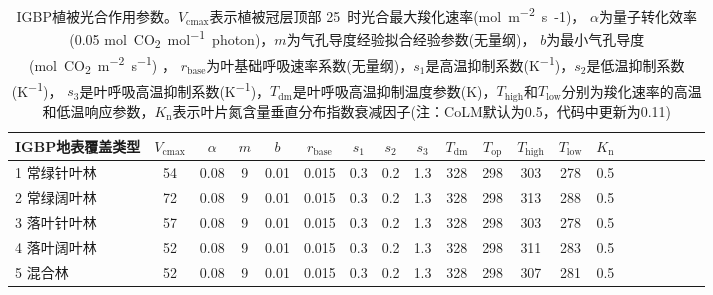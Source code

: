 \begin{landscape}
  \begin{table}[htbp]
    \centering
    \caption[IGBP植被光合作用参数]{IGBP植被光合作用参数。$V_{\mathrm{cmax}}$表示植被冠层顶部 25~\textcelsius 时光合最大羧化速率(\unit{mol.m^{-2}.s{-1}})，
      $\alpha$为量子转化效率(0.05 \unit{mol.CO_2.mol^{-1}.photon})，$m$为气孔导度经验拟合经验参数(无量纲)，
      $b$为最小气孔导度(\unit{mol.CO_2.m^{-2}.s^{-1}}) ，
      $r_{\mathrm{base}}$为叶基础呼吸速率系数(无量纲)，$s_1$是高温抑制系数(\unit{K^{-1}})，$s_2$是低温抑制系数(\unit{K^{-1}})，
    $s_3$是叶呼吸高温抑制系数(\unit{K^{-1}})，$T_{\mathrm{dm}}$是叶呼吸高温抑制温度参数(K)，$T_{\mathrm{high}}$和$T_{\mathrm{low}}$分别为羧化速率的高温和低温响应参数，$K_{\mathrm {n}} $表示叶片氮含量垂直分布指数衰减因子(注：CoLM默认为0.5，代码中更新为0.11)}
    \label{tab:IGBP植被光合作用参数1}
    \begin{tabular}{@{}lccccccccccccccccccc@{}}
      \toprule
      IGBP地表覆盖类型        & $ V_{\mathrm{cmax}}$ & $\alpha$ & $m$ & $b$  & $r_{\mathrm{base}}$ & $s_1$ & $s_2$ & $s_3$ & $T_{\mathrm{dm}}$ & $T_{\mathrm{op}}$ & $T_{\mathrm{high}}$ & $T_{\mathrm{low}}$ & $K_{\mathrm {n}} $ \\ \midrule
      1 常绿针叶林            & 54                   & 0.08     & 9   & 0.01 & 0.015               & 0.3   & 0.2   & 1.3   & 328               & 298               & 303                 & 278                & 0.5                \\
      2 常绿阔叶林            & 72                   & 0.08     & 9   & 0.01 & 0.015               & 0.3   & 0.2   & 1.3   & 328               & 298               & 313                 & 288                & 0.5                \\
      3 落叶针叶林            & 57                   & 0.08     & 9   & 0.01 & 0.015               & 0.3   & 0.2   & 1.3   & 328               & 298               & 303                 & 278                & 0.5                \\
      4 落叶阔叶林            & 52                   & 0.08     & 9   & 0.01 & 0.015               & 0.3   & 0.2   & 1.3   & 328               & 298               & 311                 & 283                & 0.5                \\
      5 混合林                & 52                   & 0.08     & 9   & 0.01 & 0.015               & 0.3   & 0.2   & 1.3   & 328               & 298               & 307                 & 281                & 0.5                \\

\end{tabular}
\end{table}
\end{landscape}
